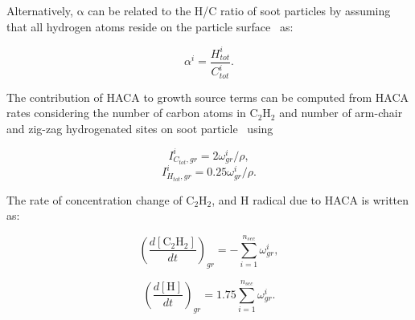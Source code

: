 Alternatively, $\mathrm{\alpha}$ can be related to the H/C ratio of soot particles by assuming that all hydrogen atoms reside on the particle surface~\citep{blanquart2009joint} as:

\begin{equation}
	\alpha^i = \frac{H^i_{tot}}{C^i_{tot}}
	\label{eqn:alpha_htoc}.
\end{equation}

The contribution of HACA to growth source terms can be computed from HACA rates considering the number of carbon atoms in $\mathrm{C_2H_2}$ and number of arm-chair and zig-zag hydrogenated sites on soot particle~\cite{blanquart2009analyzing} using

\begin{equation}
	I^i_{C_{tot},gr} = 2\omega^i_{gr}/\rho
	\label{eqn:IiCtotgr},
\end{equation}
\begin{equation}
	I^i_{H_{tot},gr} = 0.25\omega^i_{gr}/\rho
	\label{eqn:IiHtotgr}.
\end{equation}

The rate of concentration change of $\mathrm{C_2H_2}$, and H radical due to HACA is written as:

\begin{equation}
	\left(\frac{d\left[{\mathrm{C_2H_2}}\right]}{dt}\right)_{gr} = -\sum_{i=1}^{n_{sec}}\omega^i_{gr},
	\label{eqn:C2H2rate_gr}
\end{equation}

\begin{equation}
	\left(\frac{d\left[{\mathrm{H}}\right]}{dt}\right)_{gr} = 1.75 \sum_{i=1}^{n_{sec}}\omega^i_{gr}.
	\label{eqn:Hrate_gr}
\end{equation}





